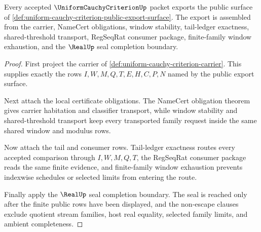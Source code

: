 \begin{theorem}
\label{thm:uniform-cauchy-criterion-public-export-package}
Every accepted $\UniformCauchyCriterionUp$ packet exports the public surface of \autoref{def:uniform-cauchy-criterion-public-export-surface}. The export is assembled from the carrier, NameCert obligations, window stability, tail-ledger exactness, shared-threshold transport, RegSeqRat consumer package, finite-family window exhaustion, and the $\RealUp$ seal completion boundary.
\end{theorem}
\begin{proof}
First project the carrier of \autoref{def:uniform-cauchy-criterion-carrier}. This supplies exactly the rows $I,W,M,Q,T,E,H,C,P,N$ named by the public export surface.

Next attach the local certificate obligations. The NameCert obligation theorem gives carrier habitation and classifier transport, while window stability and shared-threshold transport keep every transported family request inside the same shared window and modulus rows.

Now attach the tail and consumer rows. Tail-ledger exactness routes every accepted comparison through $I,W,M,Q,T$, the RegSeqRat consumer package reads the same finite evidence, and finite-family window exhaustion prevents indexwise schedules or selected limits from entering the route.

Finally apply the $\RealUp$ seal completion boundary. The seal is reached only after the finite public rows have been displayed, and the non-escape clauses exclude quotient stream families, host real equality, selected family limits, and ambient completeness.
\end{proof}

